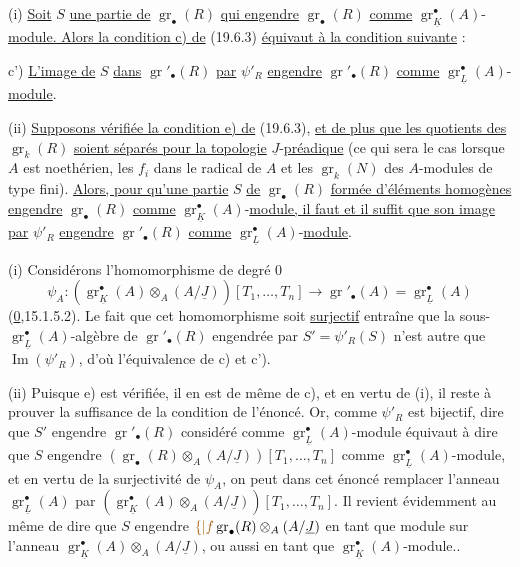(i) \uline{Soit} $S$ \uline{une partie de} $\operatorname{gr}_\bullet(R)$
\uline{qui engendre} $\operatorname{gr}_\bullet(R)$ \uline{comme}
$\operatorname{gr}_{\underline K}^\bullet(A)$-\uline{module. Alors la condition c) de}
(19.6.3) \uline{équivaut à la condition suivante} :

c') \uline{L'image de} $S$ \uline{dans} 
$\operatorname{gr}'_\bullet(R)$ \uline{par} $\psi'_R$ \uline{engendre}
$\operatorname{gr}'_\bullet(R)$ \uline{comme} $\operatorname{gr}_{\underline L}^\bullet(A)$-\uline{module}.

(ii) \uline{Supposons vérifiée la condition e) de} (19.6.3), \uline{et de plus que
les quotients des} $\operatorname{gr}_k(R)$ \uline{soient séparés pour la topologie}
$\underline J$-\uline{préadique} (ce qui sera le cas lorsque $A$ est noethérien,
les $f_i$ dans le radical de $A$ et les $\operatorname{gr}_k(N)$ des $A$-modules de type fini).
\uline{Alors, pour
qu'une partie} $S$ \uline{de} $\operatorname{gr}_\bullet(R)$
\uline{formée d'éléments homogènes engendre} $\operatorname{gr}_\bullet(R)$
\uline{comme} $\operatorname{gr}_{\underline K}^\bullet(A)$-\uline{module,
il faut et il suffit que son image par} $\psi'_R$ \uline{engendre}
$\operatorname{gr}'_\bullet(R)$ \uline{comme}
$\operatorname{gr}_{\underline L}^\bullet(A)$-\uline{module}.

(i) Considérons l'homomorphisme  de degré 0
\[
\psi_A:(\operatorname{gr}_{\underline K}^\bullet(A)\otimes_A(A/\underline J))[T_1,\ldots,T_n]
 \longrightarrow\operatorname{gr}'_\bullet(A)=\operatorname{gr}_{\underline L}^\bullet(A)
\]
(\uline{0},15.1.5.2). Le fait que cet homomorphisme soit \uline{surjectif} entraîne
que la sous-$\operatorname{gr}_{\underline L}^\bullet(A)$-algèbre de
$\operatorname{gr}'_\bullet(R)$ engendrée par $S'=\psi'_R(S)$ n'est
autre que 
$\operatorname{Im}(\psi'_R)$, d'où l'équivalence de c) et c').

(ii) Puisque e) est vérifiée, il en est de même de c), et en vertu
de (i), il reste à prouver la suffisance de la condition de l'énoncé.
Or, comme $\psi'_R$ est bijectif, dire que $S'$ engendre
$\operatorname{gr}'_\bullet(R)$ considéré comme
$\operatorname{gr}_{\underline L}^\bullet(A)$-module équivaut à dire que $S$ engendre
$(\operatorname{gr}_\bullet(R)\otimes_A(A/\underline J))[T_1,\ldots,T_n]$
comme 
$\operatorname{gr}_{\underline L}^\bullet(A)$-module, et en vertu
de la surjectivité de $\psi_A$, on peut dans cet énoncé remplacer
l'anneau $\operatorname{gr}_{\underline L}^\bullet(A)$ par
$(\operatorname{gr}_{\underline K}^\bullet(A)\otimes_A(A/\underline J))[T_1,\ldots,T_n]$.
Il revient évidemment
au même de dire que $S$ engendre
$\unsure{\{|f}\operatorname{gr}_\bullet(R)\otimes_A(A/\underline J)$ en tant que module sur
l'anneau $\operatorname{gr}_{\underline K}^\bullet(A)\otimes_A(A/\underline J)$,
ou aussi en tant que $\operatorname{gr}_{\underline K}^\bullet(A)$-module..

